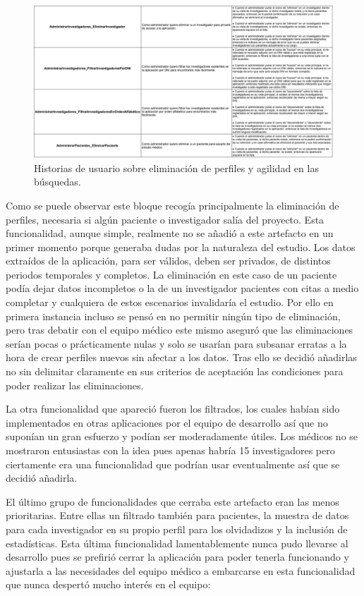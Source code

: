  \begin{figure}[h]
    \centering
     \includegraphics[width=1\textwidth]{images/historiasUsuario-4.jpg}
    \caption{Historias de usuario sobre eliminación de perfiles y agilidad en las búsquedas.}
\end{figure}

Como se puede observar este bloque recogía principalmente la eliminación de perfiles, necesaria si algún paciente o investigador salía del proyecto. Esta funcionalidad, aunque simple, realmente no se añadió a este artefacto en un primer momento porque generaba dudas por la naturaleza del estudio. Los datos extraídos de la aplicación, para ser válidos, deben ser privados, de distintos periodos temporales y completos. La eliminación en este caso de un paciente podía dejar datos incompletos o la de un investigador pacientes con citas a medio completar y cualquiera de estos escenarios invalidaría el estudio. Por ello en primera instancia incluso se pensó en no permitir ningún tipo de eliminación, pero tras debatir con el equipo médico este mismo aseguró que las eliminaciones serían pocas o prácticamente nulas y solo se usarían para subsanar erratas a la hora de crear perfiles nuevos sin afectar a los datos. Tras ello se decidió añadirlas no sin delimitar claramente en sus criterios de aceptación las condiciones para poder realizar las eliminaciones.
\newline

La otra funcionalidad que apareció fueron los filtrados, los cuales habían sido implementados en otras aplicaciones por el equipo de desarrollo así que no suponían un gran esfuerzo y podían ser moderadamente útiles. Los médicos no se mostraron entusiastas con la idea pues apenas habría 15 investigadores pero ciertamente era una funcionalidad que podrían usar eventualmente así que se decidió añadirla.
\newpage

El último grupo de funcionalidades que cerraba este artefacto eran las menos prioritarias. Entre ellas un filtrado también para pacientes, la muestra de datos para cada investigador en su propio perfil para los olvidadizos y la inclusión de estadísticas. Esta última funcionalidad lamentablemente nunca pudo llevarse al desarrollo pues se prefirió cerrar la aplicación para poder tenerla funcionando y ajustarla a las necesidades del equipo médico a embarcarse en esta funcionalidad que nunca despertó mucho interés en el equipo:
\newline

